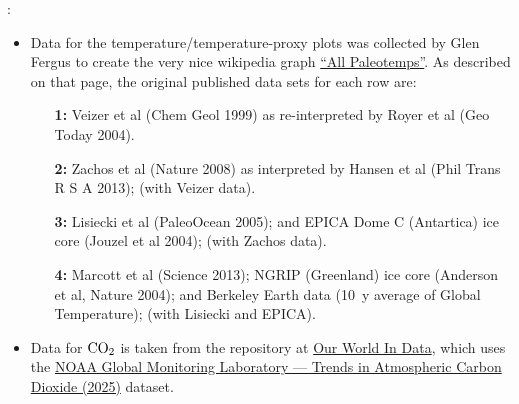 \documentclass[12pt]{article}
\begin{document}
\vspace{2cm} 

: 
\begin{itemize}
\item Data for the temperature/temperature-proxy plots was collected by Glen Fergus to create the very nice wikipedia graph \href{https://commons.wikimedia.org/wiki/File:All_palaeotemps.svg}{``All Paleotemps''}.  As described on that page, the original published data sets for each row are:
	\begin{itemize}
	\item[{\bf 1:}] Veizer et al (Chem Geol 1999) as re-interpreted by Royer et al (Geo Today 2004).
	\item[{\bf  2:}]  Zachos et al (Nature 2008) as interpreted by Hansen et al (Phil Trans R S A 2013); (with Veizer data).
	\item[{\bf  3:}]  Lisiecki et al (PaleoOcean 2005); and EPICA Dome C (Antartica) ice core (Jouzel et al 2004);  (with Zachos data).
	\item[{\bf  4:}] Marcott et al (Science 2013); NGRIP (Greenland) ice core (Anderson et al, Nature 2004); and Berkeley Earth data (10~y average of Global Temperature);  (with Lisiecki and EPICA).
	\end{itemize}
\item Data for ${\rm CO}_2$ is taken from the repository at \href{https://ourworldindata.org/grapher/co2-long-term-concentration}{Our World In Data}, which uses the \href{https://gml.noaa.gov/ccgg/trends/}{NOAA Global Monitoring Laboratory --- Trends in Atmospheric Carbon Dioxide (2025)} dataset.
\end{itemize}
\end{document}
